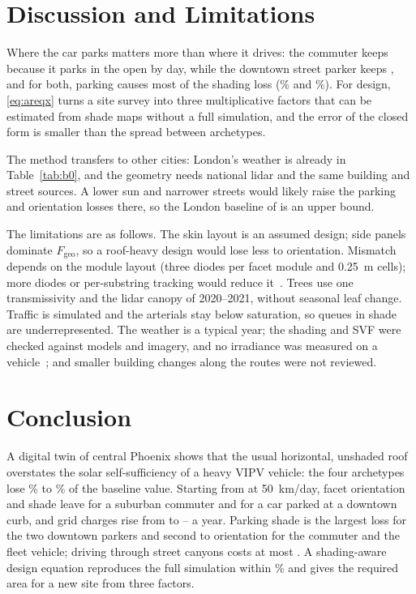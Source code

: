 \documentclass[lettersize,journal]{IEEEtran}
\newcommand{\Fgeo}{F_{\mathrm{geo}}}
\begin{document}
\section{Discussion and Limitations}
\label{sec:discussion}
Where the car parks matters more than where it drives: the commuter keeps \EfiveAOneMismatch{} because it parks in the open by day, while the downtown street parker keeps \EfiveATwoMismatch, and for both, parking causes most of the shading loss (\EfiveAOneParkShare\% and \EfiveATwoParkShare\%). For design, \eqref{eq:areqx} turns a site survey into three multiplicative factors that can be estimated from shade maps without a full simulation, and the error of the closed form is smaller than the spread between archetypes.

The method transfers to other cities: London's weather is already in Table~\ref{tab:b0}, and the geometry needs national lidar and the same building and street sources. A lower sun and narrower streets would likely raise the parking and orientation losses there, so the London baseline of \BzLonIIfss{} is an upper bound.

The limitations are as follows. The skin layout is an assumed design; side panels dominate $\Fgeo$, so a roof-heavy design would lose less to orientation. Mismatch depends on the module layout (three diodes per facet module and \SI{0.25}{m} cells); more diodes or per-substring tracking would reduce it~\cite{ref_macalpine}. Trees use one transmissivity and the lidar canopy of 2020--2021, without seasonal leaf change. Traffic is simulated and the arterials stay below saturation, so queues in shade are underrepresented. The weather is a typical year; the shading and SVF were checked against models and imagery, and no irradiance was measured on a vehicle~\cite{ref_ota}; and \FreshUnreviewed{} smaller building changes along the routes were not reviewed.

\section{Conclusion}
A digital twin of central Phoenix shows that the usual horizontal, unshaded roof overstates the solar self-sufficiency of a heavy VIPV vehicle: the four archetypes lose \EfiveAOneLoss\% to \EfiveATwoLoss\% of the baseline value. Starting from \BzPhxIIfss{} at \SI{50}{km/day}, facet orientation and shade leave \EfiveAOneMismatch{} for a suburban commuter and \EfiveATwoMismatch{} for a car parked at a downtown curb, and grid charges rise from \EfiveAOneBZeroCharges{} to \EfiveAOneMismatchCharges--\EfiveATwoMismatchCharges{} a year. Parking shade is the largest loss for the two downtown parkers and second to orientation for the commuter and the fleet vehicle; driving through street canyons costs at most \EfiveATwoBuildingsDrop. A shading-aware design equation reproduces the full simulation within \EsevenMaxErr\% and gives the required area for a new site from three factors.
\end{document}
